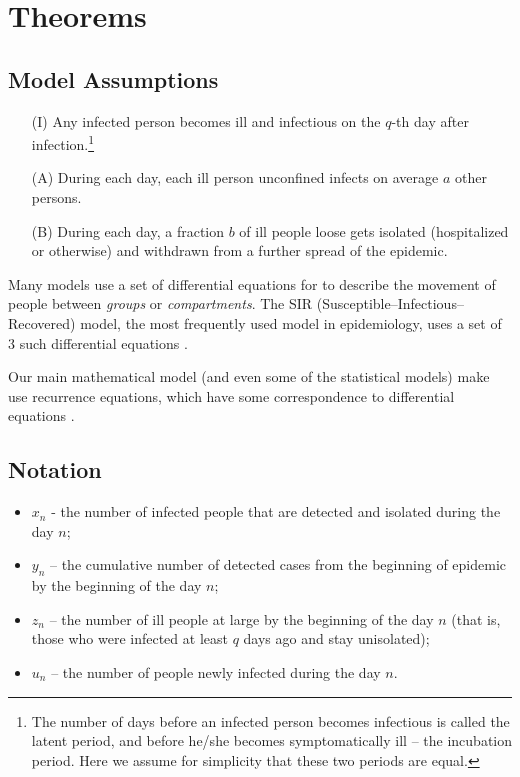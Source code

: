 \section{Theorems}
\label{ch:theorems}

\subsection{Model Assumptions}
\begin{itemize}
    \item[(I)] Any infected person becomes ill and infectious on the $q$-th day after infection.\footnote{The number of days before an infected person becomes infectious is called the latent period, and before he/she becomes symptomatically ill – the incubation period. Here we assume for simplicity that these two periods are equal.}
    \item[(A)] During each day, each ill person unconfined infects on average $a$ other persons.
    \item[(B)] During each day, a fraction $b$ of ill people loose gets isolated (hospitalized or otherwise) and withdrawn from a further spread of the epidemic.
\end{itemize}

Many models use a set of differential equations for to describe the movement of people between \textit{groups} or \textit{compartments}\cite{Parshani_2010, diffeqmodels14, NBERw27128}. The SIR (Susceptible–Infectious–Recovered) model, the most frequently used model in epidemiology, uses a set of 3 such differential equations \cite{Anderson1991, sir-intro-2020}. 

Our main mathematical model (and even some of the statistical models) make use recurrence equations, which have some correspondence to differential equations \cite{AGARWAL20021}.

\subsection{Notation}
\begin{itemize}
    \item $x_n$ - the number of infected people that are detected and isolated during the day $n$;
    \item $y_n$ – the cumulative number of detected cases from the beginning of epidemic by the beginning of the day $n$;
    \item $z_n$ – the number of ill people at large by the beginning of the day $n$ (that is, those who were infected at least $q$ days ago and stay unisolated);
    \item $u_n$ – the number of people newly infected during the day $n$.
\end{itemize}

